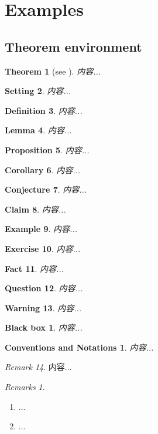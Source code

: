 \documentclass[UTF8]{amsart}
\numberwithin{equation}{section}
\theoremstyle{plain}
\newtheorem{theorem}{Theorem}[section]
\newtheorem{setting}[theorem]{Setting}
\newtheorem{definition}[theorem]{Definition}
\newtheorem{lemma}[theorem]{Lemma}
\newtheorem{proposition}[theorem]{Proposition}
\newtheorem{corollary}[theorem]{Corollary}
\newtheorem{conjecture}[theorem]{Conjecture}
\newtheorem{claim}[theorem]{Claim}
\newtheorem{eg}[theorem]{Example}
\newtheorem{ex}[theorem]{Exercise}
\newtheorem{fact}[theorem]{Fact}
\newtheorem{ques}[theorem]{Question}
\newtheorem{warning}[theorem]{Warning}
\newtheorem*{bbox}{Black box}
\newtheorem*{notation}{Conventions and Notations}
\numberwithin{equation}{section}
\theoremstyle{remark}
\newtheorem{remark}[theorem]{Remark}
\newtheorem*{remarks}{Remarks}
\begin{document}
\section{Examples}
\subsection{Theorem environment}
\begin{theorem}[{see \cite[Theorem 18.5.1]{vakil2017rising}}]
内容...
\end{theorem}

\begin{setting}
内容...
\end{setting}

\begin{definition}
内容...
\end{definition}

\begin{lemma}
内容...
\end{lemma}

\begin{proposition}
内容...
\end{proposition}

\begin{corollary}
内容...
\end{corollary}
\begin{conjecture}
内容...
\end{conjecture}
\begin{claim}
内容...
\end{claim}
\begin{eg}
内容...
\end{eg}
\begin{ex}
内容...
\end{ex}
\begin{fact}
内容...
\end{fact}
\begin{ques}
内容...
\end{ques}
\begin{warning}
内容...
\end{warning}
\begin{bbox}
内容...
\end{bbox}
\begin{notation}
内容...
\end{notation}

\begin{remark}
内容...
\end{remark}

\begin{remarks}\
\begin{enumerate}[1.]
\item ...
\item ...
\end{enumerate}
\end{remarks}



\nocite{Eberhardt2022Koszul}	%




\end{document}
